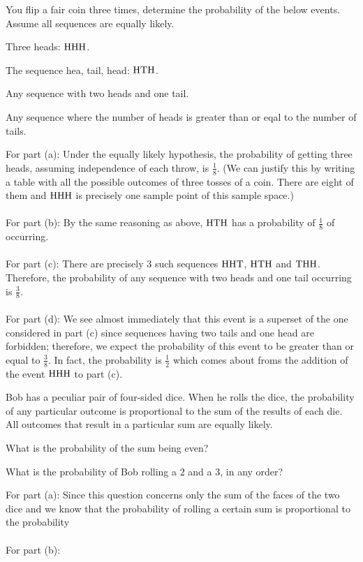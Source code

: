 \begin{problem}
  You flip a fair coin three times, determine the probability of the below
  events. Assume all sequences are equally likely.
  \begin{alphlist}
  \item Three heads: \(\mathrm{H}\mathrm{H}\mathrm{H}\).
  \item The sequence hea, tail, head: \(\mathrm{H}\mathrm{T}\mathrm{H}\).
  \item Any sequence with two heads and one tail.
  \item Any sequence where the number of heads is greater than or eqal to
    the number of tails.
  \end{alphlist}
\end{problem}
\begin{solution*}
  For part (a): Under the equally likely hypothesis, the probability of
  getting three heads, assuming independence of each throw, is
  \(\frac{1}{8}\). (We can justify this by writing a table with all the
  possible outcomes of three tosses of a coin. There are eight of them and
  \(\mathrm{H}\mathrm{H}\mathrm{H}\) is precisely one sample point of this sample space.)
  \\\\
  For part (b): By the same reasoning as above, \(\mathrm{H}\mathrm{T}\mathrm{H}\) has a
  probability of \(\frac{1}{8}\) of occurring.
  \\\\
  For part (c): There are precisely \(3\) such sequences \(\mathrm{H}\mathrm{H}\mathrm{T}\),
  \(\mathrm{H}\mathrm{T}\mathrm{H}\) and \(\mathrm{T}\mathrm{H}\mathrm{H}\). Therefore, the probability of any
  sequence with two heads and one tail occurring is \(\frac{3}{8}\).
  \\\\
  For part (d): We see almost immediately that this event is a superset of
  the one considered in part (c) since sequences having two tails and one
  head are forbidden; therefore, we expect the probability of this event to
  be greater than or equal to \(\frac{3}{8}\). In fact, the probability is
  \(\frac{1}{2}\) which comes about froms the addition of the event
  \(\mathrm{H}\mathrm{H}\mathrm{H}\) to part (c).
\end{solution*}

\begin{problem}
  Bob has a peculiar pair of four-sided dice. When he rolls the dice, the
  probability of any particular outcome is proportional to the sum of the
  results of each die. All outcomes that result in a particular sum are
  equally likely.
  \begin{alphlist}
  \item What is the probability of the sum being even?
  \item What is the probability of Bob rolling a \(2\) and a \(3\), in any
    order?
  \end{alphlist}
\end{problem}
\begin{solution*}
  For part (a): Since this question concerns only the sum of the faces of
  the two dice and we know that the probability of rolling a certain sum is
  proportional to the probability
  \\\\
  For part (b):
\end{solution*}

